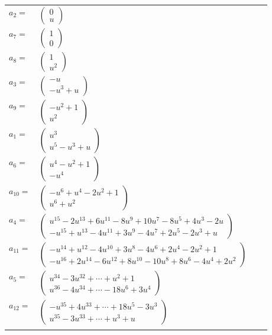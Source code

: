 \documentclass[1p]{elsarticle_modified}
\theoremstyle{definition}
\begin{document}
\begin{tabular}{m{7pt} m{180pt} m{7pt} m{180pt} }
\flushright $a_{2}=$&$\begin{pmatrix}0\\u\end{pmatrix}$ \\
\flushright $a_{7}=$&$\begin{pmatrix}1\\0\end{pmatrix}$ \\
\flushright $a_{8}=$&$\begin{pmatrix}1\\u^2\end{pmatrix}$ \\
\flushright $a_{3}=$&$\begin{pmatrix}- u\\- u^3+u\end{pmatrix}$ \\
\flushright $a_{9}=$&$\begin{pmatrix}- u^2+1\\u^2\end{pmatrix}$ \\
\flushright $a_{1}=$&$\begin{pmatrix}u^3\\u^5- u^3+u\end{pmatrix}$ \\
\flushright $a_{6}=$&$\begin{pmatrix}u^4- u^2+1\\- u^4\end{pmatrix}$ \\
\flushright $a_{10}=$&$\begin{pmatrix}- u^6+u^4-2 u^2+1\\u^6+u^2\end{pmatrix}$ \\
\flushright $a_{4}=$&$\begin{pmatrix}u^{15}-2 u^{13}+6 u^{11}-8 u^9+10 u^7-8 u^5+4 u^3-2 u\\- u^{15}+u^{13}-4 u^{11}+3 u^9-4 u^7+2 u^5-2 u^3+u\end{pmatrix}$ \\
\flushright $a_{11}=$&$\begin{pmatrix}- u^{14}+u^{12}-4 u^{10}+3 u^8-4 u^6+2 u^4-2 u^2+1\\- u^{16}+2 u^{14}-6 u^{12}+8 u^{10}-10 u^8+8 u^6-4 u^4+2 u^2\end{pmatrix}$ \\
\flushright $a_{5}=$&$\begin{pmatrix}u^{34}-3 u^{32}+\cdots+u^2+1\\u^{36}-4 u^{34}+\cdots-18 u^6+3 u^4\end{pmatrix}$ \\
\flushright $a_{12}=$&$\begin{pmatrix}- u^{35}+4 u^{33}+\cdots+18 u^5-3 u^3\\u^{35}-3 u^{33}+\cdots+u^3+u\end{pmatrix}$\\&\end{tabular}
\end{document}

